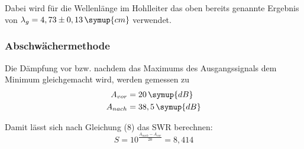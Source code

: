 Dabei wird für die Wellenlänge im Hohlleiter das oben bereits genannte Ergebnis von $\lambda_g = 4,73 \pm 0,13 \, \symup{cm}$ verwendet.

\subsubsection{Abschwächermethode}
Die Dämpfung vor bzw. nachdem das Maximums des Ausgangssignals dem Minimum
gleichgemacht wird, werden gemessen zu
\begin{align*}
  A_{vor} &= 20 \, \symup{dB} \\
  A_{nach} &= 38,5 \, \symup{dB}
\end{align*}

Damit lässt sich nach Gleichung (8) das SWR berechnen:
\begin{equation*}
  S = 10^{\frac{A_{nach}-A_{vor}}{20}} = 8,414
\end{equation*}
